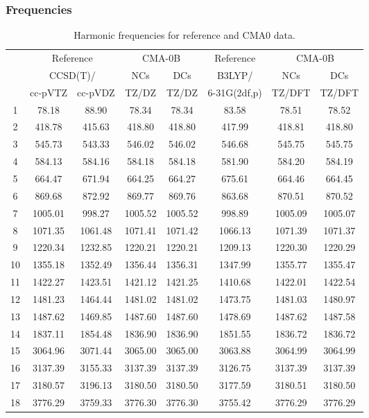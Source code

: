 \documentclass[10pt,oneside]{article}
\begin{document}
\subsubsection*{Frequencies}
\begin{table}[h!]
\centering
\caption{Harmonic frequencies for reference and CMA0 data.}
\begin{tabular}{cccccccc}
\toprule
{} & \multicolumn{2}{c}{Reference} & \multicolumn{2}{c}{CMA-0B} &    Reference & \multicolumn{2}{c}{CMA-0B} \\
{} & \multicolumn{2}{c}{CCSD(T)/} &     NCs &     DCs &       B3LYP/ &     NCs &     DCs \\
{} &   cc-pVTZ & cc-pVDZ &   TZ/DZ &   TZ/DZ & 6-31G(2df,p) &  TZ/DFT &  TZ/DFT \\
\midrule
1  &     78.18 &   88.90 &   78.34 &   78.34 &        83.58 &   78.51 &   78.52 \\
2  &    418.78 &  415.63 &  418.80 &  418.80 &       417.99 &  418.81 &  418.80 \\
3  &    545.73 &  543.33 &  546.02 &  546.02 &       546.68 &  545.75 &  545.75 \\
4  &    584.13 &  584.16 &  584.18 &  584.18 &       581.90 &  584.20 &  584.19 \\
5  &    664.47 &  671.94 &  664.25 &  664.27 &       675.61 &  664.46 &  664.45 \\
6  &    869.68 &  872.92 &  869.77 &  869.76 &       863.68 &  870.51 &  870.52 \\
7  &   1005.01 &  998.27 & 1005.52 & 1005.52 &       998.89 & 1005.09 & 1005.07 \\
8  &   1071.35 & 1061.48 & 1071.41 & 1071.42 &      1066.13 & 1071.39 & 1071.37 \\
9  &   1220.34 & 1232.85 & 1220.21 & 1220.21 &      1209.13 & 1220.30 & 1220.29 \\
10 &   1355.18 & 1352.49 & 1356.44 & 1356.31 &      1347.99 & 1355.77 & 1355.47 \\
11 &   1422.27 & 1423.51 & 1421.12 & 1421.25 &      1410.68 & 1422.01 & 1422.54 \\
12 &   1481.23 & 1464.44 & 1481.02 & 1481.02 &      1473.75 & 1481.03 & 1480.97 \\
13 &   1487.62 & 1469.85 & 1487.60 & 1487.60 &      1478.69 & 1487.62 & 1487.58 \\
14 &   1837.11 & 1854.48 & 1836.90 & 1836.90 &      1851.55 & 1836.72 & 1836.72 \\
15 &   3064.96 & 3071.44 & 3065.00 & 3065.00 &      3063.88 & 3064.99 & 3064.99 \\
16 &   3137.39 & 3155.33 & 3137.39 & 3137.39 &      3126.75 & 3137.39 & 3137.39 \\
17 &   3180.57 & 3196.13 & 3180.50 & 3180.50 &      3177.59 & 3180.51 & 3180.50 \\
18 &   3776.29 & 3759.33 & 3776.30 & 3776.30 &      3755.42 & 3776.29 & 3776.29 \\
\bottomrule
\end{tabular}
\end{table}
\end{document}
